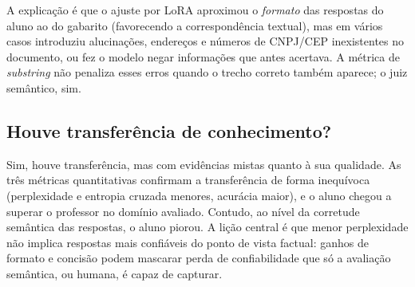 A explicação é que o ajuste por LoRA aproximou o \emph{formato} das respostas do
aluno ao do gabarito (favorecendo a correspondência textual), mas em vários casos
introduziu alucinações, endereços e números de CNPJ/CEP inexistentes no documento, ou
fez o modelo negar informações que antes acertava. A métrica de \textit{substring}
não penaliza esses erros quando o trecho correto também aparece; o juiz semântico,
sim.

\subsection{Houve transferência de conhecimento?}

Sim, houve transferência, mas com evidências mistas quanto à sua qualidade. As três
métricas quantitativas confirmam a transferência de forma inequívoca (perplexidade e
entropia cruzada menores, acurácia maior), e o aluno chegou a superar o professor no
domínio avaliado. Contudo, ao nível da corretude semântica das respostas, o aluno
piorou. A lição central é que menor perplexidade não implica respostas mais confiáveis
do ponto de vista factual: ganhos de formato e concisão podem mascarar perda de
confiabilidade que só a avaliação semântica, ou humana, é capaz de capturar.
